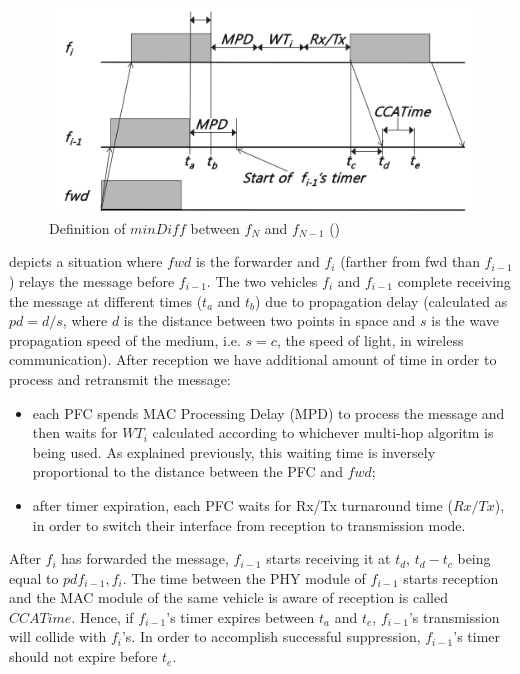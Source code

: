 			\begin{figure}[H]
				\centering
				\includegraphics[width=\textwidth]{immagini/minDiff}
				\caption{Definition of $minDiff$ between $f_N$ and $f_{N-1}$ (\cite{6906275})}
				\label{fig:minDiff}
			\end{figure}
		
			 depicts a situation where $fwd$ is the forwarder and $f_i$ (farther from fwd than $f_{i-1}$) relays the message before $f_{i-1}$. The two vehicles $f_i$ and $f_{i-1}$ complete receiving the message at different times ($t_a$ and $t_b$) due to propagation delay (calculated as $pd = d / s$, where $d$ is the distance between two points in space and $s$ is the wave propagation speed of the medium, i.e. $s=c$, the speed of light, in wireless communication). After reception we have additional amount of time in order to process and retransmit the message:
			\begin{itemize}
				\item each PFC spends MAC Processing Delay (MPD) to process the message and then waits for $WT_i$ calculated according to whichever multi-hop algoritm is being used. As explained previously, this waiting time is inversely proportional to the distance between the PFC and $fwd$;
				\item after timer expiration, each PFC waits for Rx/Tx turnaround time ($Rx/Tx$), in order to switch their interface from reception to transmission mode.
			\end{itemize}
			After $f_i$ has forwarded the message, $f_{i-1}$ starts receiving it at $t_d$, $t_d-t_c$  being equal to $pd{f_{i-1}, f_i}$. The time between the PHY module of $f_{i-1}$ starts reception and the MAC module of the same vehicle is aware of reception is called $CCATime$. Hence, if $f_{i-1}$'s timer expires between $t_a$ and $t_e$, $f_{i-1}$'s transmission will collide with $f_i$'s. In order to accomplish successful suppression, $f_{i-1}$'s timer should not expire  before $t_e$. 
			
